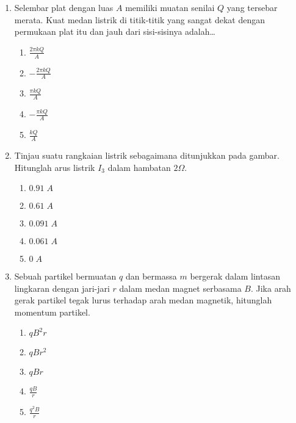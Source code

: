 \documentclass[A4,12PT, english, twocolumn]{journal}
\begin{document}
\begin{enumerate}
\item Selembar plat dengan luas $A$ memiliki muatan senilai $Q$ yang tersebar merata. Kuat medan listrik di titik-titik yang sangat dekat dengan permukaan plat itu dan jauh dari sisi-sisinya adalah\dots
    \begin{enumerate}
        \item $\frac{2 \pi k Q }{A}$
        \item $-\frac{2 \pi k Q }{A}$
        \item $\frac{\pi k Q }{A}$
        \item $-\frac{\pi k Q }{A}$
        \item $\frac{k Q }{A}$
    \end{enumerate}
  
\item Tinjau suatu rangkaian listrik sebagaimana ditunjukkan pada gambar. Hitunglah arus listrik $I_3$ dalam hambatan $2\Omega$.
\begin{center}
\end{center}
    \begin{enumerate}
        \item $0.91 \; A$
        \item $0.61 \; A$
        \item $0.091 \; A$
        \item $0.061 \; A$
        \item $0 \; A$
    \end{enumerate}

\item Sebuah partikel bermuatan $q$ dan bermassa $m$ bergerak dalam lintasan lingkaran dengan jari-jari $r$ dalam medan magnet serbasama $B$. Jika arah gerak partikel tegak lurus terhadap arah medan magnetik, hitunglah momentum partikel.
    \begin{enumerate}
        \item $qB^2r$
        \item $qBr^2$
        \item $qBr$
        \item $\frac{qB}{r}$
        \item $\frac{q^2B}{r}$
    \end{enumerate}


\end{enumerate}
\end{document}
